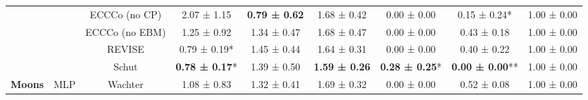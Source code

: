 \begin{table}
{\begin{tabular}[t]{>{}c|c|c|c|c|c|c|c|c}
 &  & ECCCo (no CP) & 2.07 ± 1.15\hphantom{*}\hphantom{*} & \textbf{0.79 ± 0.62}\hphantom{*}\hphantom{*} & 1.68 ± 0.42\hphantom{*}\hphantom{*} & 0.00 ± 0.00\hphantom{*}\hphantom{*} & 0.15 ± 0.24*\hphantom{*} & 1.00 ± 0.00\hphantom{*}\hphantom{*}\\

 &  & ECCCo (no EBM) & 1.25 ± 0.92\hphantom{*}\hphantom{*} & 1.34 ± 0.47\hphantom{*}\hphantom{*} & 1.68 ± 0.47\hphantom{*}\hphantom{*} & 0.00 ± 0.00\hphantom{*}\hphantom{*} & 0.43 ± 0.18\hphantom{*}\hphantom{*} & 1.00 ± 0.00\hphantom{*}\hphantom{*}\\

 &  & REVISE & 0.79 ± 0.19*\hphantom{*} & 1.45 ± 0.44\hphantom{*}\hphantom{*} & 1.64 ± 0.31\hphantom{*}\hphantom{*} & 0.00 ± 0.00\hphantom{*}\hphantom{*} & 0.40 ± 0.22\hphantom{*}\hphantom{*} & 1.00 ± 0.00\hphantom{*}\hphantom{*}\\

 &  & Schut & \textbf{0.78 ± 0.17}*\hphantom{*} & 1.39 ± 0.50\hphantom{*}\hphantom{*} & \textbf{1.59 ± 0.26}\hphantom{*}\hphantom{*} & \textbf{0.28 ± 0.25}*\hphantom{*} & \textbf{0.00 ± 0.00}** & 1.00 ± 0.00\hphantom{*}\hphantom{*}\\

\multirow{-12}{*}{\centering\arraybackslash \textbf{Moons}} & \multirow{-6}{*}{\centering\arraybackslash MLP} & Wachter & 1.08 ± 0.83\hphantom{*}\hphantom{*} & 1.32 ± 0.41\hphantom{*}\hphantom{*} & 1.69 ± 0.32\hphantom{*}\hphantom{*} & 0.00 ± 0.00\hphantom{*}\hphantom{*} & 0.52 ± 0.08\hphantom{*}\hphantom{*} & 1.00 ± 0.00\hphantom{*}\hphantom{*}\\
\hline
\end{tabular}}
\end{table}
